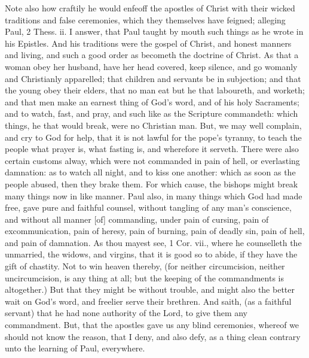Note also how craftily he would enfeoff the apostles of 
Christ with their wicked traditions and false ceremonies, 
which they themselves have feigned; alleging Paul, 
2 Thess. ii. I answer, that Paul taught by mouth such 
things as he wrote in his Epistles. And his traditions 
were the gospel of Christ, and honest manners and living, 
and such a good order as becometh the doctrine of Christ. 
As that a woman obey her husband, have her head covered, 
keep silence, and go womanly and Christianly apparelled; 
that children and servants be in subjection; and that the 
young obey their elders, that no man eat but he that laboureth,
and worketh; and that men make an earnest 
thing of God's word, and of his holy Sacraments; and 
to watch, fast, and pray, and such like as the Scripture 
commandeth: which things, he that would break, were 
no Christian man. But, we may well complain, and 
cry to God for help, that it is not lawful for the pope's 
tyranny, to teach the people what prayer is, what fasting 
is, and wherefore it serveth. There were also certain 
customs alway, which were not commanded in pain of 
hell, or everlasting damnation: as to watch all night, 
and to kiss one another: which as soon as the people 
abused, then they brake them. For which cause, the 
bishops might break many things now in like manner. 
Paul also, in many things which God had made free, gave 
pure and faithful counsel, without tangling of any man's 
conscience, and without all manner [of] commanding, under 
pain of cursing, pain of excommunication, pain of heresy, 
pain of burning, pain of deadly sin, pain of hell, and 
pain of damnation. As thou mayest see, 1 Cor. vii., 
where he counselleth the unmarried, the widows, and virgins,
that it is good so to abide, if they have the gift of 
chastity. Not to win heaven thereby, (for neither circumcision,
neither uncircumcision, is any thing at all; but the 
keeping of the commandments is altogether.) But that 
they might be without trouble, and might also the better 
wait on God's word, and freelier serve their brethren. And 
saith, (as a faithful servant) that he had none authority of 
the Lord, to give them any commandment. But, that the 
apostles gave us any blind ceremonies, whereof we should 
not know the reason, that I deny, and also defy, as a 
thing clean contrary unto the learning of Paul, everywhere. 

